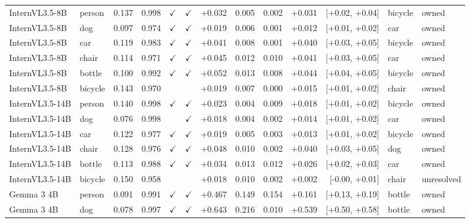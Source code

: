 \begin{longtable}{llrrccrrrrrll}
\rowcolor{cfSlate2}InternVL3.5-8B & person & 0.137 & 0.998 & $\checkmark$ & $\checkmark$ & +0.032 & 0.005 & 0.002 & +0.031 & [+0.02, +0.04] & bicycle & owned \\
\rowcolor{cfSlate2}InternVL3.5-8B & dog & 0.097 & 0.974 & $\checkmark$ & $\checkmark$ & +0.019 & 0.006 & 0.001 & +0.012 & [+0.01, +0.02] & car & owned \\
\rowcolor{cfSlate2}InternVL3.5-8B & car & 0.119 & 0.983 & $\checkmark$ & $\checkmark$ & +0.041 & 0.008 & 0.001 & +0.040 & [+0.03, +0.05] & bicycle & owned \\
\rowcolor{cfSlate2}InternVL3.5-8B & chair & 0.114 & 0.971 & $\checkmark$ & $\checkmark$ & +0.045 & 0.012 & 0.010 & +0.041 & [+0.03, +0.05] & car & owned \\
\rowcolor{cfSlate2}InternVL3.5-8B & bottle & 0.100 & 0.992 & $\checkmark$ & $\checkmark$ & +0.052 & 0.013 & 0.008 & +0.044 & [+0.04, +0.05] & bicycle & owned \\
\rowcolor{cfSlate2}InternVL3.5-8B & bicycle & 0.143 & 0.970 &  &  & +0.019 & 0.007 & 0.000 & +0.015 & [+0.01, +0.02] & chair & owned \\
\rowcolor{cfSlate2}InternVL3.5-14B & person & 0.140 & 0.998 & $\checkmark$ & $\checkmark$ & +0.023 & 0.004 & 0.009 & +0.018 & [+0.01, +0.02] & bicycle & owned \\
\rowcolor{cfSlate2}InternVL3.5-14B & dog & 0.076 & 0.998 &  & $\checkmark$ & +0.018 & 0.004 & 0.002 & +0.014 & [+0.01, +0.02] & car & owned \\
\rowcolor{cfSlate2}InternVL3.5-14B & car & 0.122 & 0.977 & $\checkmark$ & $\checkmark$ & +0.019 & 0.005 & 0.003 & +0.013 & [+0.01, +0.02] & bicycle & owned \\
\rowcolor{cfSlate2}InternVL3.5-14B & chair & 0.128 & 0.976 & $\checkmark$ & $\checkmark$ & +0.048 & 0.010 & 0.002 & +0.040 & [+0.03, +0.05] & dog & owned \\
\rowcolor{cfSlate2}InternVL3.5-14B & bottle & 0.113 & 0.988 & $\checkmark$ & $\checkmark$ & +0.034 & 0.013 & 0.012 & +0.026 & [+0.02, +0.03] & car & owned \\
InternVL3.5-14B & bicycle & 0.150 & 0.958 &  &  & +0.018 & 0.010 & 0.002 & +0.002 & [-0.00, +0.01] & chair & unresolved \\
\rowcolor{cfSlate2}Gemma 3 4B & person & 0.091 & 0.991 & $\checkmark$ & $\checkmark$ & +0.467 & 0.149 & 0.154 & +0.161 & [+0.13, +0.19] & bottle & owned \\
\rowcolor{cfSlate2}Gemma 3 4B & dog & 0.078 & 0.997 & $\checkmark$ & $\checkmark$ & +0.643 & 0.216 & 0.010 & +0.539 & [+0.50, +0.58] & bottle & owned \\

\end{longtable}

